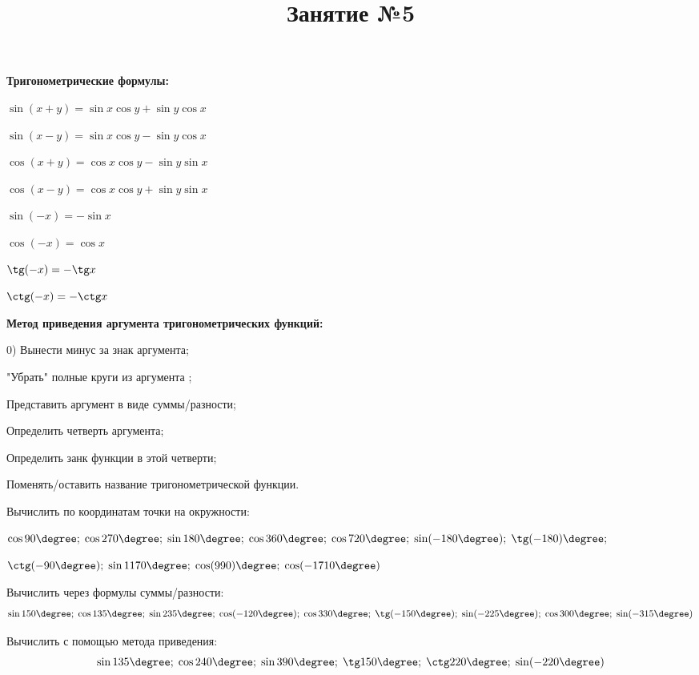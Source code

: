\newpage
\title{Занятие №5}
\begin{listofex}
	\item \textbf{Тригонометрические формулы:}
	\begin{enumcols}[itemcolumns=2]
		\item \( \sin(x+y)=\sin x\cos y + \sin y \cos x \)
		\item \( \sin(x-y)=\sin x\cos y - \sin y \cos x \)
		\item \( \cos(x+y)=\cos x\cos y - \sin y \sin x \)
		\item \( \cos(x-y)=\cos x\cos y + \sin y \sin x \)
		\item \( \sin(-x)=-\sin x \)
		\item \( \cos(-x)=\cos x \)
		\item \( \tg(-x)=-\tg x \)
		\item \( \ctg(-x)=-\ctg x \)
	\end{enumcols}
	\item \textbf{Метод приведения аргумента тригонометрических функций:}
	\begin{enumcols}
		\item[0)] Вынести минус за знак аргумента;
		\item "Убрать" полные круги из аргумента ;
		\item Представить аргумент в виде суммы/разности;
		\item Определить четверть аргумента;
		\item Определить занк функции в этой четверти;
		\item Поменять/оставить название тригонометрической функции.
	\end{enumcols}
	\item Вычислить по координатам точки на окружности:
	\begin{enumcols}[itemcolumns=1]
		\item \( \cos90\degree;\;\cos270\degree;\;\sin 180\degree;\;\cos360\degree;\;\cos720\degree;\;\sin(-180\degree);\;\tg(-180)\degree; \)
		\item \( \ctg(-90\degree);\;\sin1170\degree;\;\cos(990)\degree;\;\cos(-1710\degree) \)
	\end{enumcols}
	\item Вычислить через формулы суммы/разности:
	\[ \sin150\degree;\;\cos135\degree;\;\sin235\degree;\;\cos(-120\degree);\;\cos330\degree;\;\tg(-150\degree);\;\sin(-225\degree);\;\cos300\degree;\;\sin(-315\degree) \]
	\item Вычислить с помощью метода приведения:
	\[ \sin135\degree;\;\cos240\degree;\;\sin390\degree;\;\tg150\degree;\;\ctg220\degree;\;\sin(-220\degree) \]

\end{listofex}
